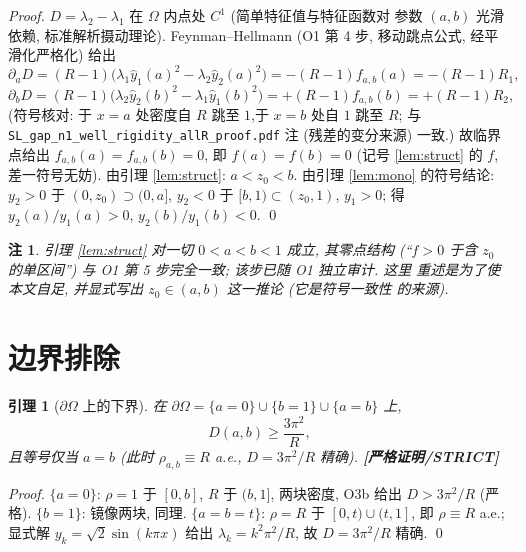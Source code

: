 \documentclass[UTF8]{ctexart}
\newtheorem{lemma}[theorem]{引理}
\newtheorem{remark}[theorem]{注}
\newcommand{\STRICT}{\textbf{[严格证明/STRICT]}}
\begin{document}
\begin{proof}
	$D=\lambda_2-\lambda_1$ 在 $\Omega$ 内点处 $C^1$ (简单特征值与特征函数对
	参数 $(a,b)$ 光滑依赖, 标准解析摄动理论). Feynman--Hellmann
	(O1 第 4 步, 移动跳点公式, 经平滑化严格化) 给出
	\begin{equation}
		\partial_aD=(R-1)\bigl(\lambda_1\hat y_1(a)^2-\lambda_2\hat y_2(a)^2\bigr)
		=-(R-1)f_{a,b}(a)=-(R-1)R_1,
		\label{eq:FH1}
	\end{equation}
	\begin{equation}
		\partial_bD=(R-1)\bigl(\lambda_2\hat y_2(b)^2-\lambda_1\hat y_1(b)^2\bigr)
		=+(R-1)f_{a,b}(b)=+(R-1)R_2,
		\label{eq:FH2}
	\end{equation}
	(符号核对: 于 $x=a$ 处密度自 $R$ 跳至 $1$,\allowbreak 于 $x=b$ 处自 $1$ 跳至 $R$;
	与 \texttt{SL\_gap\_n1\_well\_\allowbreak rigidity\_allR\_proof.pdf} 注 (残差的变分来源)
	一致.) 故临界点给出 $f_{a,b}(a)=f_{a,b}(b)=0$, 即
	$f(a)=f(b)=0$ (记号 \ref{lem:struct} 的 $f$, 差一符号无妨).
	由引理 \ref{lem:struct}: $a<z_0<b$. 由引理 \ref{lem:mono} 的符号结论:
	$y_2>0$ 于 $(0,z_0)\supset(0,a]$, $y_2<0$ 于 $[b,1)\subset(z_0,1)$,
	$y_1>0$; 得 $y_2(a)/y_1(a)>0$, $y_2(b)/y_1(b)<0$. \qed
\end{proof}

\begin{remark}
	引理 \ref{lem:struct} 对一切 $0<a<b<1$ 成立, 其零点结构 (``$f>0$ 于含
	$z_0$ 的单区间'') 与 O1 第 5 步完全一致; 该步已随 O1 独立审计. 这里
	重述是为了使本文自足, 并显式写出 $z_0\in(a,b)$ 这一推论 (它是符号一致性
	的来源).
\end{remark}

\section{边界排除}\label{sec:boundary}

\begin{lemma}[$\partial\Omega$ 上的下界]\label{lem:boundary}
	在 $\partial\Omega=\{a=0\}\cup\{b=1\}\cup\{a=b\}$ 上,
	\begin{equation}
		D(a,b)\ge\frac{3\pi^2}{R},
		\label{eq:bound}
	\end{equation}
	且等号仅当 $a=b$ (此时 $\rho_{a,b}\equiv R$ a.e., $D=3\pi^2/R$ 精确).
	\STRICT{}
\end{lemma}

\begin{proof}
	$\{a=0\}$: $\rho=1$ 于 $[0,b]$, $R$ 于 $(b,1]$, 两块密度, O3b 给出
	$D>3\pi^2/R$ (严格). $\{b=1\}$: 镜像两块, 同理. $\{a=b=t\}$:
	$\rho=R$ 于 $[0,t)\cup(t,1]$, 即 $\rho\equiv R$ a.e.; 显式解
	$y_k=\sqrt2\sin(k\pi x)$ 给出 $\lambda_k=k^2\pi^2/R$, 故
	$D=3\pi^2/R$ 精确. \qed
\end{proof}
\end{document}
